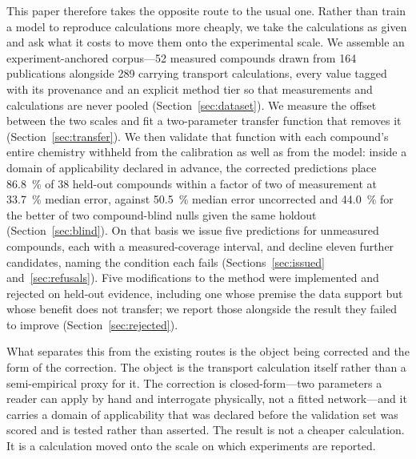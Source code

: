 This paper therefore takes the opposite route to the usual one. Rather than train a model to
reproduce calculations more cheaply, we take the calculations as given and ask what it costs to move
them onto the experimental scale. We assemble an experiment-anchored corpus---\num{52} measured
compounds drawn from \num{164} publications alongside \num{289} carrying transport calculations,
every value tagged with its provenance and an explicit method tier so that measurements and
calculations are never pooled (Section~\ref{sec:dataset}). We measure the offset between the two
scales and fit a two-parameter transfer function that removes it
(Section~\ref{sec:transfer}). We then validate that function with each compound's entire chemistry
withheld from the calibration as well as from the model: inside a domain of applicability declared
in advance, the corrected predictions place \SI{86.8}{\percent} of \num{38} held-out compounds
within a factor of two of measurement at \SI{33.7}{\percent} median error, against
\SI{50.5}{\percent} median error uncorrected and \SI{44.0}{\percent} for the better of two
compound-blind nulls given the same holdout (Section~\ref{sec:blind}). On that basis we issue five
predictions for unmeasured compounds, each with a measured-coverage interval, and decline eleven
further candidates, naming the condition each fails (Sections~\ref{sec:issued}
and~\ref{sec:refusals}). Five modifications to the method were implemented and rejected on held-out
evidence, including one whose premise the data support but whose benefit does not transfer; we
report those alongside the result they failed to improve (Section~\ref{sec:rejected}).

What separates this from the existing routes is the object being corrected and the form of the
correction. The object is the transport calculation itself rather than a semi-empirical proxy for
it. The correction is closed-form---two parameters a reader can apply by hand and interrogate
physically, not a fitted network---and it carries a domain of applicability that was declared
before the validation set was scored and is tested rather than asserted. The result is not a cheaper
calculation. It is a calculation moved onto the scale on which experiments are reported.
